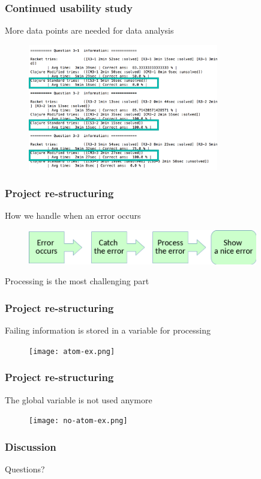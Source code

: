 \documentclass{beamer}
\begin{document}
\begin{frame}
  \frametitle{Continued usability study }
More data points are needed for data analysis
\begin{figure}
\includegraphics[height=55mm]{one-data.png}
\end{figure}
\end{frame}


\begin{frame}
  \frametitle{Project re-structuring}
How we handle when an error occurs 
\begin{figure}
\includegraphics[height=15mm]{Step.png}
\end{figure}
\alert{Processing} is the most challenging part
\end{frame}


\begin{frame}
  \frametitle{Project re-structuring}
Failing information is stored in a variable for processing
\begin{figure}
\texttt{[image: atom-ex.png]}
\end{figure}
\end{frame}

\begin{frame}
  \frametitle{Project re-structuring}
The global variable is not used anymore
\begin{figure}
\texttt{[image: no-atom-ex.png]}
\end{figure}
\end{frame}

\begin{frame}
  \frametitle{Discussion}
Questions?
\end{frame}
\end{document}

